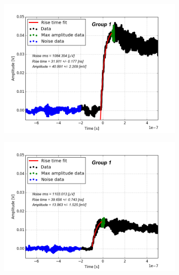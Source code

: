 \documentclass[12pt]{article}
\begin{document}
\begin{figure}[h!!]
  \centering
  \begin{subfigure}[t]{0.45\textwidth}
    \centering
    \includegraphics[width=1.1\textwidth]{./graphics/data_6.png}
  \end{subfigure}
  \hfill
  \begin{subfigure}[t]{0.45\textwidth}
    \centering
    \includegraphics[width=1.1\textwidth]{./graphics/data_7.png}
  \end{subfigure}
  \hfill
  \begin{subfigure}[t]{0.45\textwidth}
    \centering

\end{subfigure}
\end{figure}
\end{document}
